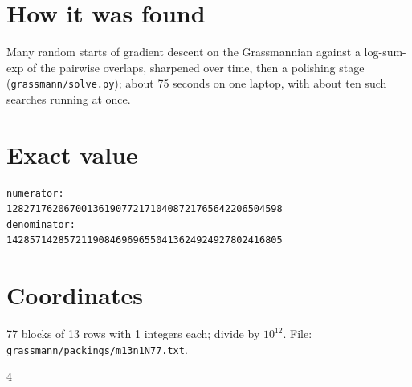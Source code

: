 \documentclass[11pt,a4paper]{article}
\begin{document}
\section{How it was found}
Many random starts of gradient descent on the Grassmannian against a log-sum-exp of the pairwise overlaps, sharpened over time, then a polishing stage (\texttt{grassmann/solve.py}); about 75 seconds on one laptop, with about ten such searches running at once.


\appendix
\section{Exact value}
{\small
\begin{verbatim}
numerator:
128271762067001361907721710408721765642206504598
denominator:
142857142857211908469696550413624924927802416805
\end{verbatim}}

\section{Coordinates}
77 blocks of 13 rows with 1 integers each; divide by $10^{12}$. File: \texttt{grassmann/packings/m13n1N77.txt}.
{\tiny
\begin{multicols}{4}
\end{multicols}}
\end{document}
